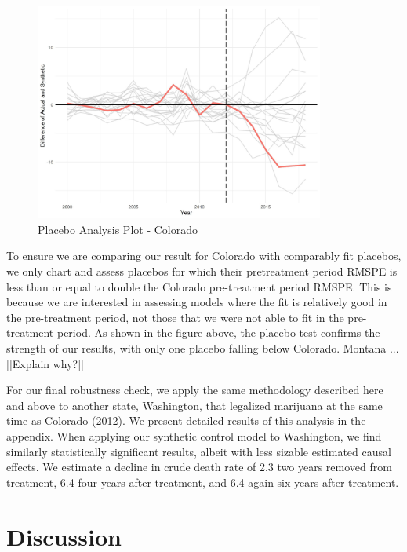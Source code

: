 \documentclass{article}
\begin{document}
\begin{figure}[H]
	\begin{center}
		\includegraphics[width=0.85\textwidth]{placebos_plot_colorado}
	\end{center}
	\caption{Placebo Analysis Plot - Colorado}
	\label{fig:placebos_plot_colorado}
\end{figure}

To ensure we are comparing our result for Colorado with comparably fit placebos, we only chart and assess placebos for which their pretreatment period RMSPE is less than or equal to double the Colorado pre-treatment period RMSPE. This is because we are interested in assessing models where the fit is relatively good in the pre-treatment period, not those that we were not able to fit in the pre-treatment period. As shown in the figure above, the placebo test confirms the strength of our results, with only one placebo falling below Colorado.  Montana ... [[Explain why?]]

For our final robustness check, we apply the same methodology described here and above to another state, Washington, that legalized marijuana at the same time as Colorado (2012). We present detailed results of this analysis in the appendix. When applying our synthetic control model to Washington, we find similarly statistically significant results, albeit with less sizable estimated causal effects. We estimate a decline in crude death rate of 2.3 two years removed from treatment, 6.4 four years after treatment, and 6.4 again six years after treatment.

\section{Discussion}
\end{document}
